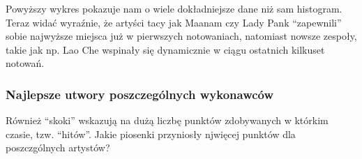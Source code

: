 \documentclass[11pt]{article}
\begin{document}
    Powyższy wykres pokazuje nam o wiele dokładniejsze dane niż sam
histogram. Teraz widać wyraźnie, że artyści tacy jak Maanam czy Lady
Pank ``zapewnili'' sobie najwyższe miejsca już w pierwszych notowaniach,
natomiast nowsze zespoły, takie jak np. Lao Che wspinały się dynamicznie
w ciągu ostatnich kilkuset notowań.

\hypertarget{najlepsze-utwory-poszczeguxf3lnych-wykonawcuxf3w}{%
\subsubsection{Najlepsze utwory poszczególnych
wykonawców}\label{najlepsze-utwory-poszczeguxf3lnych-wykonawcuxf3w}}

Również ``skoki'' wskazują na dużą liczbę punktów zdobywanych w którkim
czasie, tzw. ``hitów''. Jakie piosenki przyniosły njwięcej punktów dla
poszczgólnych artystów?
\end{document}
